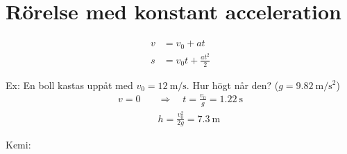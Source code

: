 \section{Rörelse med konstant acceleration}

\begin{align*}
  v &= v_0 + at \\
  s &= v_0 t + \frac{at^2}{2}
\end{align*}

Ex: En boll kastas uppåt med $v_0 = \SI{12}{\metre\per\second}$.
Hur högt når den? ($g = \SI{9,82}{\metre\per\second\squared}$)
\begin{align*}
  v = 0 \quad &\Rightarrow \quad t = \frac{v_0}{g} = \SI{1,22}{\second} \\
  &\boxed{h = \frac{v_0^2}{2g} = \num{7,3}}\ \si{\metre}
\end{align*}


Kemi: 
